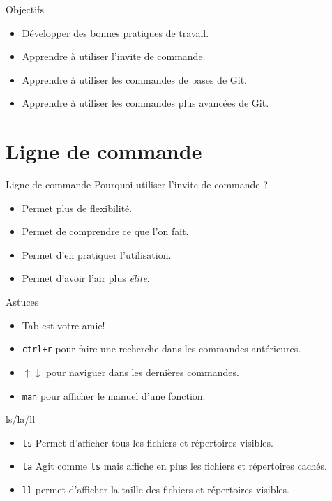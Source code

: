 \documentclass[11pt]{beamer}
\begin{document}
\begin{frame}{Objectifs}
	
	\begin{itemize}
		\item Développer des bonnes pratiques de travail.
		\item Apprendre à utiliser l'invite de commande.
		\item Apprendre à utiliser les commandes de bases de Git.
		\item Apprendre à utiliser les commandes plus avancées de Git.
	\end{itemize}
\end{frame}


\section[Ligne de commande]{Ligne de commande}


\begin{frame}{Ligne de commande}
	Pourquoi utiliser l'invite de commande ?
	\begin{itemize}
		\item<1-> Permet plus de flexibilité.
		\item<2-> Permet de comprendre ce que l'on fait.
		\item<3-> Permet d'en pratiquer l'utilisation.
		\item<4-> Permet d'avoir l'air plus \textit{élite}.
	\end{itemize}
\end{frame}


\begin{frame}[fragile]{Astuces}
	\begin{itemize}[<+->]
		\item Tab est votre amie!
		\item \verb|ctrl+r| pour faire une recherche dans les commandes antérieures.
		\item $\uparrow \downarrow$ pour naviguer dans les dernières commandes.
		\item \verb|man| pour afficher le manuel d'une fonction.
	\end{itemize}
\end{frame}

\begin{frame}[fragile]{ls/la/ll}
	\begin{itemize}[<+->]
		\item \verb|ls| Permet d'afficher tous les fichiers et répertoires visibles.
		\item \verb|la| Agit comme \verb|ls| mais affiche en plus les fichiers et répertoires cachés.
		\item \verb|ll| permet d'afficher la taille des fichiers et répertoires visibles.
	\end{itemize}
\end{frame}
\end{document}
